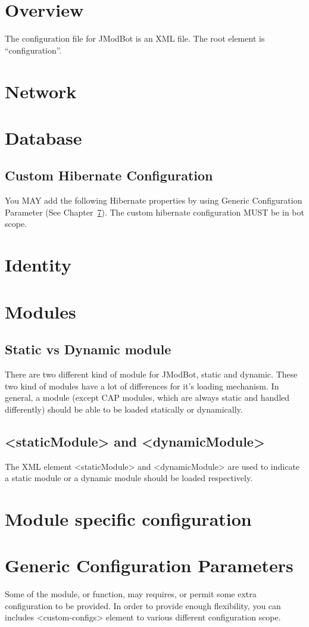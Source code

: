 \documentclass{report}
\newcommand{\elem}[1]{\textless #1\textgreater}
\begin{document}
	\chapter{Overview}
	The configuration file for JModBot is an XML file. The root element is ``configuration''. 
	
	\chapter{Network}
	\chapter{Database}
	\section{Custom Hibernate Configuration}
	You MAY add the following Hibernate properties by using Generic Configuration Parameter (See Chapter~\ref{c:gcp}).
	The custom hibernate configuration MUST be in bot scope.
	\chapter{Identity}
	\chapter{Modules}
	\section{Static vs Dynamic module}
	There are two different kind of module for JModBot, static and dynamic. These two kind of modules have a lot of differences for it's loading mechanism. In general, a module (except CAP modules, which are always static and handled differently) should be able to be loaded statically or dynamically.
	\section{\elem{staticModule} and \elem{dynamicModule}}\label{key_staticModule}\label{key_dynamicModule}
	The XML element \elem{staticModule} and \elem{dynamicModule} are used to indicate a static module or a dynamic module should be loaded respectively.
	\chapter{Module specific configuration}
	\chapter{Generic Configuration Parameters}\label{c:gcp}
	Some of the module, or function, may requires, or permit some extra configuration to be provided. In order
	to provide enough flexibility, you can includes \elem{custom-configs} element to various
	different configuration scope.
\end{document}

